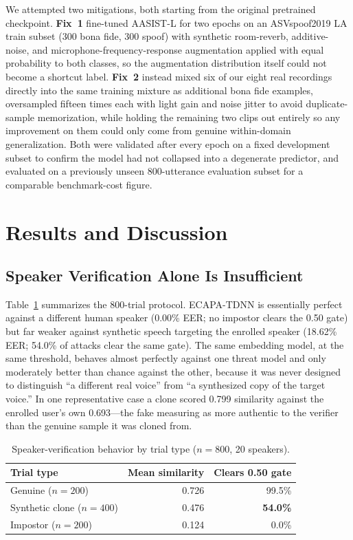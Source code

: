 \documentclass[conference]{IEEEtran}
\begin{document}
We attempted two mitigations, both starting from the original pretrained
checkpoint. \textbf{Fix~1} fine-tuned AASIST-L for two epochs on an ASVspoof2019
LA train subset (300 bona fide, 300 spoof) with synthetic room-reverb,
additive-noise, and microphone-frequency-response augmentation applied with
equal probability to both classes, so the augmentation distribution itself
could not become a shortcut label. \textbf{Fix~2} instead mixed six of our eight
real recordings directly into the same training mixture as additional bona fide
examples, oversampled fifteen times each with light gain and noise jitter to
avoid duplicate-sample memorization, while holding the remaining two clips out
entirely so any improvement on them could only come from genuine within-domain
generalization. Both were validated after every epoch on a fixed development
subset to confirm the model had not collapsed into a degenerate predictor, and
evaluated on a previously unseen 800-utterance evaluation subset for a
comparable benchmark-cost figure.

\section{Results and Discussion}\label{sec:results}

\subsection{Speaker Verification Alone Is Insufficient}

Table~\ref{tab:sv} summarizes the 800-trial protocol. ECAPA-TDNN is essentially
perfect against a different human speaker (0.00\% EER; no impostor clears the
0.50 gate) but far weaker against synthetic speech targeting the enrolled
speaker (18.62\% EER; 54.0\% of attacks clear the same gate). The same
embedding model, at the same threshold, behaves almost perfectly against one
threat model and only moderately better than chance against the other, because
it was never designed to distinguish ``a different real voice'' from ``a
synthesized copy of the target voice.'' In one representative case a clone
scored 0.799 similarity against the enrolled user's own 0.693---the fake
measuring as more authentic to the verifier than the genuine sample it was
cloned from.

\begin{table}[t]
\caption{Speaker-verification behavior by trial type ($n=800$, 20 speakers).}
\label{tab:sv}
\centering
\footnotesize
\begin{tabular}{@{}lrr@{}}
\toprule
\textbf{Trial type} & \textbf{Mean similarity} & \textbf{Clears 0.50 gate}\\
\midrule
Genuine ($n=200$)          & 0.726 & 99.5\%\\
Synthetic clone ($n=400$)  & 0.476 & \textbf{54.0\%}\\
Impostor ($n=200$)         & 0.124 & 0.0\%\\
\bottomrule
\end{tabular}
\end{table}
\end{document}
